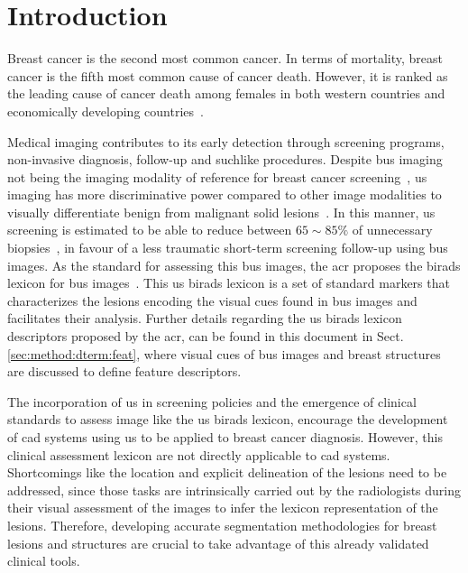 \graphicspath{ {./content/intro/figures/} }

\section{Introduction}
\label{sec:intro}  %


Breast cancer is the second most common cancer.
In terms of mortality, breast cancer is the fifth most common cause of cancer death.
However, it is ranked as the leading cause of cancer death among females in both western countries and economically developing countries~\cite{cancerStatistics2011}.

Medical imaging contributes to its early detection through screening programs, non-invasive diagnosis, follow-up and suchlike procedures.
Despite \ac{bus} imaging not being the imaging modality of reference for breast cancer screening~\cite{smith2003american}, \ac{us} imaging has more discriminative power compared to other image modalities to visually differentiate benign from malignant solid lesions~\cite{Stavros:1995p12392}.
In this manner, \ac{us} screening is estimated to be able to reduce 
between $65\sim85\%$ of unnecessary biopsies~\cite{yuan2010multimodality}, in favour of a less traumatic short-term screening follow-up using \ac{bus} images.
As the standard for assessing this \ac{bus} images, the \ac{acr} proposes the \ac{birads} lexicon for \ac{bus} images~\cite{biradsus}.
This \ac{us} \ac{birads} lexicon is a set of standard markers that characterizes the lesions encoding the visual cues found in \ac{bus} images and facilitates their analysis.
Further details regarding the \ac{us} \ac{birads} lexicon descriptors proposed by the \ac{acr}, can be found in this document in Sect.\,\ref{sec:method:dterm:feat}, where visual cues of \ac{bus} images and breast structures are discussed to define feature descriptors.

The incorporation of \ac{us} in screening policies and the emergence of clinical standards to assess image like the \ac{us} \ac{birads} lexicon, encourage the development of \ac{cad} systems using \ac{us} to be applied to breast cancer diagnosis.
However, this clinical assessment lexicon are not directly applicable to \ac{cad} systems. 
Shortcomings like the location and explicit delineation of the lesions need to be addressed, since those tasks are intrinsically carried out by the radiologists during their visual assessment of the images to infer the lexicon representation of the lesions.
Therefore, developing accurate segmentation methodologies for breast lesions and structures are crucial to take advantage of this already validated clinical tools.

